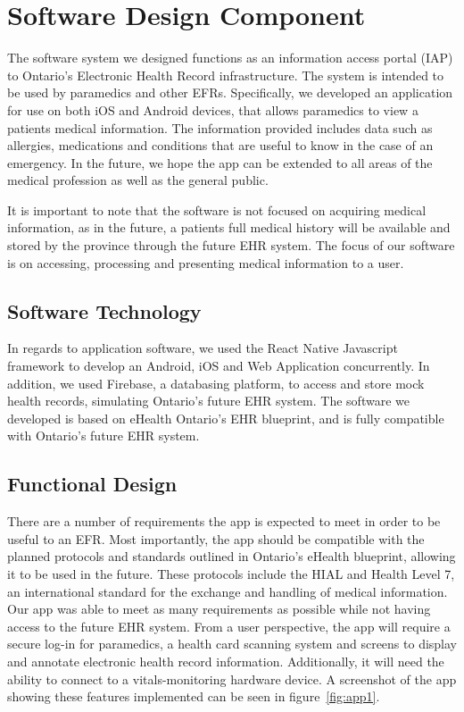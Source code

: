 
\section{Software Design Component}

The software system we designed functions as an information access portal (IAP) to Ontario's Electronic Health Record infrastructure. The system is intended to be used by paramedics and other EFRs. Specifically, we developed an application for use on both iOS and Android devices, that allows paramedics to view a patients medical information. The information provided includes data such as allergies, medications and conditions that are useful to know in the case of an emergency. In the future, we hope the app can be extended to all areas of the medical profession as well as the general public.

It is important to note that the software is not focused on acquiring medical information, as in the future, a patients full medical history will be available and stored by the province through the future EHR system. The focus of our software is on accessing, processing and presenting medical information to a user.

\subsection{Software Technology}
In regards to application software, we used the React Native Javascript framework to develop an Android, iOS and Web Application concurrently. In addition, we used Firebase, a databasing platform, to access and store mock health records, simulating Ontario's future EHR system. The software we developed is based on eHealth Ontario's EHR blueprint, and is fully compatible with Ontario's future EHR system.

\subsection{Functional Design}

There are a number of requirements the app is expected to meet in order to be useful to an EFR. Most importantly, the app should be compatible with the planned protocols and standards outlined in Ontario's eHealth blueprint, allowing it to be used in the future. These protocols include the HIAL and Health Level 7, an international standard for the exchange and handling of medical information.
Our app was able to meet as many requirements as possible while not having access to the future EHR system.
From a user perspective, the app will require a secure log-in for paramedics, a health card scanning system and screens to display and annotate electronic health record information. Additionally, it will need the ability to connect to a vitals-monitoring hardware device. A screenshot of the app  showing these features implemented can be seen in figure~\ref{fig:app1}.


